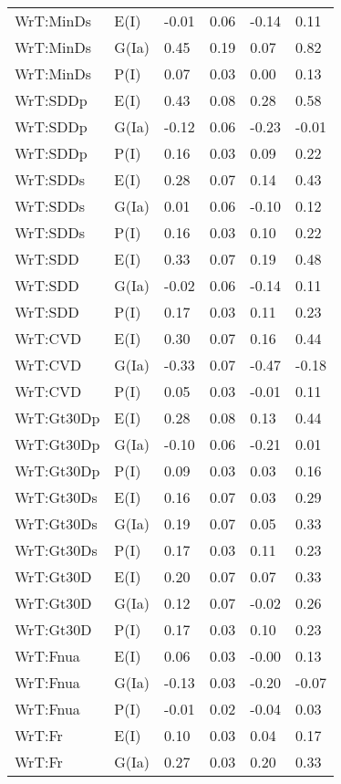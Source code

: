 \begin{center}
\begin{longtable}{|p{1.1in}|p{0.7in}|p{0.7in}|p{0.6in}|p{0.6in}|p{0.6in}|}
  WrT:MinDs & E(I) & -0.01 & 0.06 & -0.14 & 0.11 \\ 
  WrT:MinDs & G(Ia) & 0.45 & 0.19 & 0.07 & 0.82 \\ 
  WrT:MinDs & P(I) & 0.07 & 0.03 & 0.00 & 0.13 \\ 
  WrT:SDDp & E(I) & 0.43 & 0.08 & 0.28 & 0.58 \\ 
  WrT:SDDp & G(Ia) & -0.12 & 0.06 & -0.23 & -0.01 \\ 
  WrT:SDDp & P(I) & 0.16 & 0.03 & 0.09 & 0.22 \\ 
  WrT:SDDs & E(I) & 0.28 & 0.07 & 0.14 & 0.43 \\ 
  WrT:SDDs & G(Ia) & 0.01 & 0.06 & -0.10 & 0.12 \\ 
  WrT:SDDs & P(I) & 0.16 & 0.03 & 0.10 & 0.22 \\ 
  WrT:SDD & E(I) & 0.33 & 0.07 & 0.19 & 0.48 \\ 
  WrT:SDD & G(Ia) & -0.02 & 0.06 & -0.14 & 0.11 \\ 
  WrT:SDD & P(I) & 0.17 & 0.03 & 0.11 & 0.23 \\ 
  WrT:CVD & E(I) & 0.30 & 0.07 & 0.16 & 0.44 \\ 
  WrT:CVD & G(Ia) & -0.33 & 0.07 & -0.47 & -0.18 \\ 
  WrT:CVD & P(I) & 0.05 & 0.03 & -0.01 & 0.11 \\ 
  WrT:Gt30Dp & E(I) & 0.28 & 0.08 & 0.13 & 0.44 \\ 
  WrT:Gt30Dp & G(Ia) & -0.10 & 0.06 & -0.21 & 0.01 \\ 
  WrT:Gt30Dp & P(I) & 0.09 & 0.03 & 0.03 & 0.16 \\ 
  WrT:Gt30Ds & E(I) & 0.16 & 0.07 & 0.03 & 0.29 \\ 
  WrT:Gt30Ds & G(Ia) & 0.19 & 0.07 & 0.05 & 0.33 \\ 
  WrT:Gt30Ds & P(I) & 0.17 & 0.03 & 0.11 & 0.23 \\ 
  WrT:Gt30D & E(I) & 0.20 & 0.07 & 0.07 & 0.33 \\ 
  WrT:Gt30D & G(Ia) & 0.12 & 0.07 & -0.02 & 0.26 \\ 
  WrT:Gt30D & P(I) & 0.17 & 0.03 & 0.10 & 0.23 \\ 
  WrT:Fnua & E(I) & 0.06 & 0.03 & -0.00 & 0.13 \\ 
  WrT:Fnua & G(Ia) & -0.13 & 0.03 & -0.20 & -0.07 \\ 
  WrT:Fnua & P(I) & -0.01 & 0.02 & -0.04 & 0.03 \\ 
  WrT:Fr & E(I) & 0.10 & 0.03 & 0.04 & 0.17 \\ 
  WrT:Fr & G(Ia) & 0.27 & 0.03 & 0.20 & 0.33 \\ 

\end{longtable}
\end{center}
